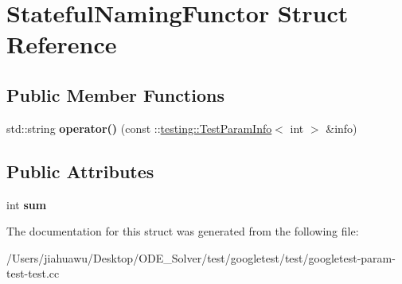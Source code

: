 \hypertarget{struct_stateful_naming_functor}{}\section{Stateful\+Naming\+Functor Struct Reference}
\label{struct_stateful_naming_functor}
\subsection*{Public Member Functions}
\begin{DoxyCompactItemize}
\item 
\mbox{\label{struct_stateful_naming_functor_a6a1d07c0b8314c1aee535f269ea536db}} 
std\+::string {\bfseries operator()} (const \+::\mbox{\hyperlink{structtesting_1_1_test_param_info}{testing\+::\+Test\+Param\+Info}}$<$ int $>$ \&info)
\end{DoxyCompactItemize}
\subsection*{Public Attributes}
\begin{DoxyCompactItemize}
\item 
\mbox{\label{struct_stateful_naming_functor_a95887cf031d3113ae2edcd7617af3b79}} 
int {\bfseries sum}
\end{DoxyCompactItemize}


The documentation for this struct was generated from the following file\+:\begin{DoxyCompactItemize}
\item 
/\+Users/jiahuawu/\+Desktop/\+O\+D\+E\+\_\+\+Solver/test/googletest/test/googletest-\/param-\/test-\/test.\+cc\end{DoxyCompactItemize}

